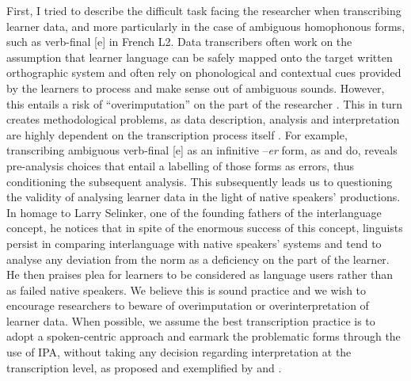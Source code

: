 \documentclass[output=paper,colorlinks,citecolor=brown,modfonts,nonflat]{../langscibook}
\begin{document}
First, I tried to describe the difficult task facing the researcher when transcribing learner data, and more particularly in the case of ambiguous homophonous forms, such as verb-final [e] in French L2. Data transcribers often work on the assumption that learner language can be safely mapped onto the target written orthographic system and often rely on phonological and contextual cues provided by the learners to process and make sense out of ambiguous sounds. However, this entails a risk of “overimputation” on the part of the researcher \citep{Nickerson1999}. This in turn creates methodological problems, as data description, analysis and interpretation are highly dependent on the transcription process itself \citep{Mondada2007}. For example, transcribing ambiguous verb-final [e] as an infinitive –\textit{er} form, as \citet{Herschensohn2001} and \citet{Prévost2007French, Prévost2007English} do, reveals pre-analysis choices that entail a labelling of those forms as errors, thus conditioning the subsequent analysis. This subsequently leads us to questioning the validity of analysing learner data in the light of native speakers’ productions. In  homage to Larry Selinker, one of the founding fathers of the interlanguage concept, he notices that in spite of the enormous success of this concept, linguists persist in comparing interlanguage with native speakers’ systems and tend to analyse any deviation from the norm as a deficiency on the part of the learner. He then praises  plea for learners to be considered as language users rather than as failed native speakers. We believe this is sound practice and we wish to encourage researchers to beware of overimputation or overinterpretation of learner data. When possible, we assume the best transcription practice is to adopt a spoken-centric approach and earmark the problematic forms through the use of IPA, without taking any decision regarding interpretation at the transcription level, as proposed and exemplified by \citet{Mondada2002,Granget2015} and \citet{Saturno2015}.
\end{document}

